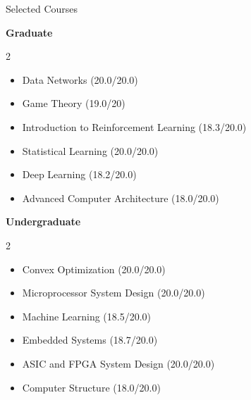 \documentclass{resume} %
\begin{document}
\begin{rSection}{Selected Courses}
\vspace{-1.25em}
\item \textbf{Graduate}
\vspace*{-7pt}
\begin{multicols}{2}
\begin{itemize}
    \itemsep -3pt {}
    \item Data Networks (20.0/20.0)
    \item Game Theory (19.0/20)
    \item Introduction to Reinforcement Learning (18.3/20.0)
    \item Statistical Learning (20.0/20.0)
    \item Deep Learning (18.2/20.0)
    \item Advanced Computer Architecture (18.0/20.0)
\end{itemize}
\end{multicols}
\vspace*{-12pt}
\item \textbf{Undergraduate}
\vspace*{-7pt}
\begin{multicols}{2}
\begin{itemize}
    \itemsep -3pt {}
    \item Convex Optimization (20.0/20.0)
    \item Microprocessor System Design (20.0/20.0)
    \item Machine Learning (18.5/20.0)
    \item Embedded Systems (18.7/20.0)
    \item ASIC and FPGA System Design (20.0/20.0)
    \item Computer Structure (18.0/20.0)
\end{itemize}
\end{multicols}
\vspace*{-12pt}

\end{rSection}
\end{document}
